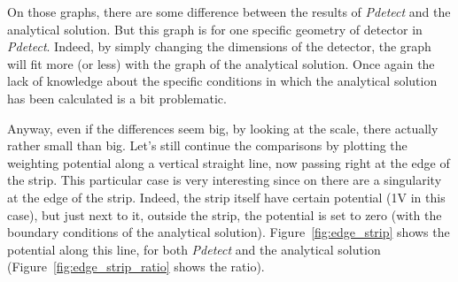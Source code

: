 \documentclass[11pt]{article}
\begin{document}
	On those graphs, there are some difference between the results of \textit{Pdetect} and the
	analytical solution. But this graph is for one specific geometry of detector in \textit{Pdetect}.
	Indeed, by simply changing the dimensions of the detector, the graph will fit more (or less) with
	the graph of the analytical solution. Once again the lack of knowledge about the specific conditions
	in which the analytical solution has been calculated is a bit problematic.

	Anyway, even if the differences seem big, by looking at the scale, there actually rather small
	than big. Let's still continue the comparisons by plotting the weighting potential along
	a vertical straight line, now passing right at the edge of the strip. This particular case
	is very interesting since on there are a singularity at the edge of the strip. Indeed, the
	strip itself have certain potential (1V in this case), but just next to it, outside the strip,
	the potential is set to zero (with the boundary conditions of the analytical solution).
	Figure~\ref{fig:edge_strip} shows the potential along this line, for both \textit{Pdetect}
	and the analytical solution (Figure~\ref{fig:edge_strip_ratio} shows the ratio).
\end{document}
